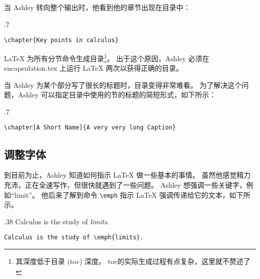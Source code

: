 当 Ashley 转向整个输出时，他看到他的章节出现在目录中：

\begin{miniexammar}{.7\textandmarginlen}{
\faketoc
{}
}
\begin{lstlisting}
\chapter{Key points in calculus}
\end{lstlisting}
\end{miniexammar}
\LaTeX{} 为所有分节命令生成目录\footnote{其深度低于目录 (toc) 深度。 toc的实际生成过程有点复杂，这里就不赘述了}。 出于这个原因，Ashley 必须在 encapsulation.tex 上运行 \LaTeX{} 两次以获得正确的目录。

当 Ashley 为某个部分写了很长的标题时，目录变得非常难看。 为了解决这个问题，Ashley 可以指定目录中使用的节的标题的简短形式，如下所示：
\begin{miniexammar}{.7\textandmarginlen}{
\faketoc
{}
}
\begin{lstlisting}
\chapter[A Short Name]{A very very long Caption}
\end{lstlisting}
\end{miniexammar}

\subsection{调整字体} \label{subsec:fonts}
到目前为止，Ashley 知道如何指示 \LaTeX{} 做一些基本的事情。 虽然他感觉精力充沛，正在全速写作，但很快就遇到了一些问题。 Ashley 想强调一些关键字，例如“limit”。 他后来了解到命令 \verb=\emph= 指示 \LaTeX{} 强调传递给它的文本，如下所示。

\begin{parexammar}{.38\textandmarginlen}{
Calculus is the study of \emph{limits}.
}
\begin{lstlisting}
Calculus is the study of \emph{limits}.
\end{lstlisting}
\end{parexammar}

